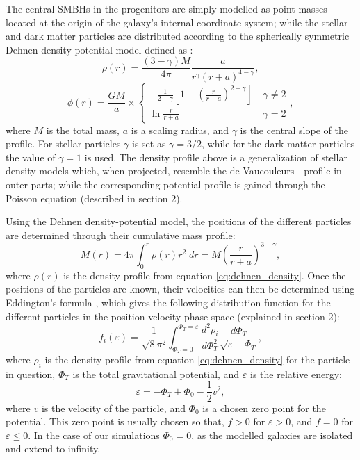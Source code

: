 \documentclass[english, oneside]{HYgradu}
\begin{document}
The central SMBHs in the progenitors are simply modelled as point masses located at the origin of the galaxy's internal coordinate system; while the stellar and dark matter particles are distributed according to the spherically symmetric Dehnen density-potential model defined as \citep{Dehnen1993}:
\begin{equation}
\rho(r) = \frac{(3-\gamma)M}{4\pi} \frac{a}{r^\gamma (r+a)^{4-\gamma}}, \label{eq:dehnen_density}
\end{equation}
\begin{equation}
\phi(r) = \frac{GM}{a} \times 
\begin{cases}
	-\frac{1}{2-\gamma} \left[ 1 - \left( \frac{r}{r+a} \right)^{2-\gamma} \right] & \; \gamma \neq 2 \\
	\ln \frac{r}{r+a}	 & \; \gamma = 2
\end{cases},
\label{eq:dehnen_potential}
\end{equation}
where $M$ is the total mass, $a$ is a scaling radius, and $\gamma$ is the central slope of the profile. For stellar particles $\gamma$ is set as $\gamma = 3/2$, while for the dark matter particles the value of $\gamma = 1$ is used. The density profile above is a generalization of stellar density models which, when projected, resemble the de Vaucouleurs - profile \citep[$\log(\mu) \propto R^{1/4}-1$;][]{deVaucouleurs1948} in outer parts; while the corresponding potential profile is  gained through the Poisson equation (described in section 2). 

Using the Dehnen density-potential model, the positions of the different particles are determined through their cumulative mass profile:
\begin{equation}
M(r) = 4\pi \int^r_0 \rho(r)r^2 \;dr = M \left( \frac{r}{r+a} \right)^{3-\gamma}, \label{eq:cumulative_mass}
\end{equation}
where $\rho(r)$ is the density profile from equation \ref{eq:dehnen_density}. Once the positions of the particles are known, their velocities can then be determined using Eddington's formula \citep{BinneyTremaine}, which gives the following distribution function for the different particles in the position-velocity phase-space (explained in section 2):
\begin{equation}
f_i(\varepsilon) = \frac{1}{\sqrt{8}\pi^2} \int^{\Phi_T = \varepsilon}_{\Phi_T = 0} \frac{d^2\rho_i}{d\Phi^2_T}
\frac{d\Phi_T}{\sqrt{\varepsilon - \Phi_T}}, \label{eq:eddington_form}
\end{equation}
where $\rho_i$ is the density profile from equation \ref{eq:dehnen_density} for the particle in question, $\Phi_T$ is the total gravitational potential, and $\varepsilon$ is the relative energy:
\begin{equation}
\varepsilon = -\Phi_T + \Phi_0 - \frac{1}{2} v^2,
\end{equation}
where $v$ is the velocity of the particle, and $\Phi_0$ is a chosen zero point for the potential. This zero point is usually chosen so that, $f > 0$ for $\varepsilon > 0$, and $f = 0$ for $\varepsilon \leq 0$. In the case of our simulations $\Phi_0 = 0$, as the modelled galaxies are isolated and extend to infinity.
\end{document}
